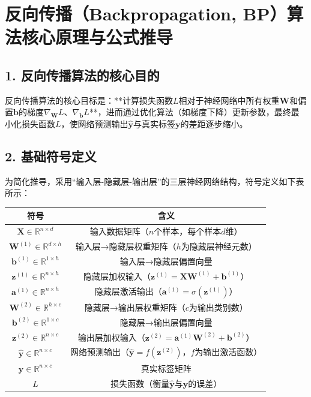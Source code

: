\documentclass[12pt,a4paper]{article}
\newcommand{\Wone}{\mathbf{W}^{(1)}}    %
\newcommand{\Wtwo}{\mathbf{W}^{(2)}}    %
\newcommand{\bone}{\mathbf{b}^{(1)}}    %
\newcommand{\btwo}{\mathbf{b}^{(2)}}    %
\newcommand{\zone}{\mathbf{z}^{(1)}}    %
\newcommand{\ztwo}{\mathbf{z}^{(2)}}    %
\newcommand{\aone}{\mathbf{a}^{(1)}}    %
\newcommand{\yhat}{\hat{\mathbf{y}}}    %
\newcommand{\ytrue}{\mathbf{y}}         %
\newcommand{\Xinput}{\mathbf{X}}        %
\newcommand{\Loss}{L}                   %
\newcommand{\sigmoid}{\sigma}           %
\begin{document}
\section{反向传播（Backpropagation, BP）算法核心原理与公式推导}

\subsection{1. 反向传播算法的核心目的}
反向传播算法的核心目标是：**计算损失函数\(\Loss\)相对于神经网络中所有权重\(\mathbf{W}\)和偏置\(\mathbf{b}\)的梯度\(\nabla_{\mathbf{W}}\Loss\)、\(\nabla_{\mathbf{b}}\Loss\)**，进而通过优化算法（如梯度下降）更新参数，最终最小化损失函数\(\Loss\)，使网络预测输出\(\yhat\)与真实标签\(\ytrue\)的差距逐步缩小。


\subsection{2. 基础符号定义}
为简化推导，采用“输入层-隐藏层-输出层”的三层神经网络结构，符号定义如下表所示：

\begin{center}
\begin{tabular}{|c|c|}
\hline
符号 & 含义 \\
\hline
\(\Xinput \in \mathbb{R}^{n \times d}\) & 输入数据矩阵（\(n\)个样本，每个样本\(d\)维） \\
\(\Wone \in \mathbb{R}^{d \times h}\) & 输入层→隐藏层权重矩阵（\(h\)为隐藏层神经元数） \\
\(\bone \in \mathbb{R}^{1 \times h}\) & 输入层→隐藏层偏置向量 \\
\(\zone \in \mathbb{R}^{n \times h}\) & 隐藏层加权输入（\(\zone = \Xinput\Wone + \bone\)） \\
\(\aone \in \mathbb{R}^{n \times h}\) & 隐藏层激活输出（\(\aone = \sigmoid(\zone)\)） \\
\(\Wtwo \in \mathbb{R}^{h \times c}\) & 隐藏层→输出层权重矩阵（\(c\)为输出类别数） \\
\(\btwo \in \mathbb{R}^{1 \times c}\) & 隐藏层→输出层偏置向量 \\
\(\ztwo \in \mathbb{R}^{n \times c}\) & 输出层加权输入（\(\ztwo = \aone\Wtwo + \btwo\)） \\
\(\yhat \in \mathbb{R}^{n \times c}\) & 网络预测输出（\(\yhat = f(\ztwo)\)，\(f\)为输出激活函数） \\
\(\ytrue \in \mathbb{R}^{n \times c}\) & 真实标签矩阵 \\
\(\Loss\) & 损失函数（衡量\(\yhat\)与\(\ytrue\)的误差） \\
\hline
\end{tabular}
\end{center}
\end{document}

